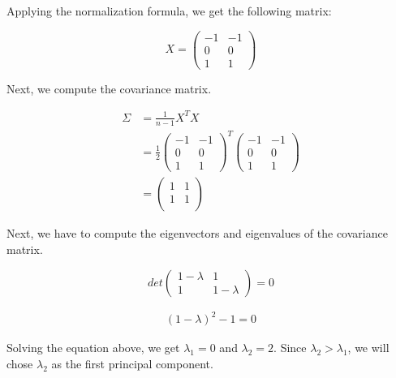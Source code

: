 \documentclass{article}
\begin{document}
Applying the normalization formula, we get the following matrix:

\[ X = 
    \begin{pmatrix}
        -1 & -1 \\
        0 & 0 \\
        1 & 1
    \end{pmatrix}
\]

Next, we compute the covariance matrix.

\begin{equation}
    \begin{aligned}
        \Sigma &= \frac{1}{n - 1} X^TX \\
               &= \frac{1}{2} 
                \begin{pmatrix}
                    -1 & -1 \\
                    0 & 0 \\
                    1 & 1
                \end{pmatrix}^T
                \begin{pmatrix}
                    -1 & -1 \\
                    0 & 0 \\
                    1 & 1
                \end{pmatrix} \\
                & = \begin{pmatrix}
                    1 & 1 \\
                    1 & 1 \\
                \end{pmatrix}   
    \end{aligned}
\end{equation}

Next, we have to compute the eigenvectors and eigenvalues of the covariance matrix.

\[
    det\begin{pmatrix}
        1 -  \lambda & 1 \\
        1 & 1 - \lambda
    \end{pmatrix}
    = 0
\]

\begin{equation}
    \begin{aligned}
        (1 -  \lambda)^2 - 1 = 0
    \end{aligned}
\end{equation}

Solving the equation above, we get $\lambda_1 = 0$ and $\lambda_2= 2$. Since $\lambda_2 > \lambda_1$, we will chose $\lambda_2$ as the first principal component.
\end{document}
